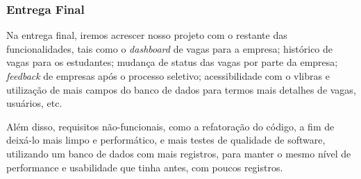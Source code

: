 \subsubsection{Entrega Final}

Na entrega final, iremos acrescer nosso projeto com o restante das funcionalidades, tais como o \emph{dashboard} de vagas para a empresa; histórico de vagas para os estudantes; mudança de status das vagas por parte da empresa; \emph{feedback} de empresas após o processo seletivo;  acessibilidade com o \gls{vlibras} e utilização de mais campos do banco de dados para termos mais detalhes de vagas, usuários, etc.

Além disso, requisitos não-funcionais, como a refatoração do código, a fim de deixá-lo mais limpo e performático, e mais testes de qualidade de software, utilizando um banco de dados com mais registros, para manter o mesmo nível de performance e usabilidade que tinha antes, com poucos registros.